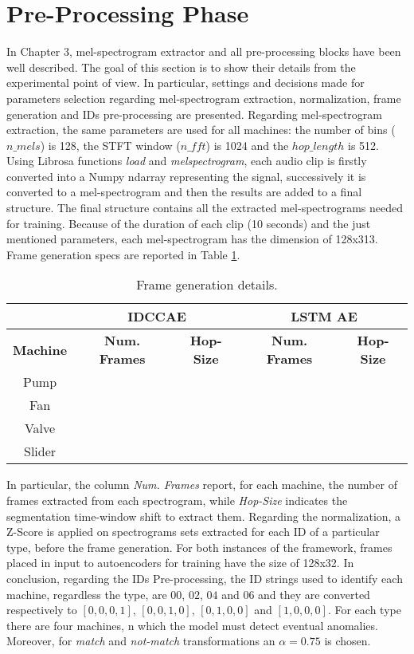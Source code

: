 \section{Pre-Processing Phase}
In Chapter 3, mel-spectrogram extractor and all pre-processing blocks have been well described. The goal of this section is to show their details from the experimental point of view. In particular, settings and decisions made for parameters selection regarding mel-spectrogram extraction, normalization, frame generation and IDs pre-processing are presented. Regarding mel-spectrogram extraction, the same parameters are used for all machines: the number of bins ($n\_mels$) is 128, the STFT window ($n\_fft$) is 1024 and the $hop\_length$ is 512. Using Librosa functions \textit{load} and \textit{melspectrogram}, each audio clip is firstly converted into a Numpy ndarray representing the signal, successively it is converted to a mel-spectrogram and then the results are added to a final structure. The final structure contains all the extracted mel-spectrograms needed for training. Because of the duration of each clip (10 seconds) and the just mentioned parameters, each mel-spectrogram has the dimension of 128x313. Frame generation specs are reported in Table \ref{frame-generation}.\\
\begin{table}[ht]
\centering
\begin{tabular}{|c|c|c|c|c|} 
\cline{2-5}
\multicolumn{1}{c|}{} & \multicolumn{2}{c|}{\textbf{IDCCAE}} & \multicolumn{2}{c|}{\textbf{LSTM AE}} \\ 
\hline
\textbf{Machine} & \textbf{Num. Frames} & \textbf{Hop-Size} & \textbf{Num. Frames} & \textbf{Hop-Size} \\ 
\hline
Pump &  &  &  &  \\ 
\hline
Fan &  &  &  &  \\ 
\hline
Valve &  &  &  &  \\ 
\hline
Slider &  &  &  &  \\
\hline
\end{tabular}
\caption{Frame generation details.}
\label{frame-generation}
\end{table}
In particular, the column \textit{Num. Frames} report, for each machine, the number of frames extracted from each spectrogram, while \textit{Hop-Size} indicates the segmentation time-window shift to extract them. Regarding the normalization, a Z-Score is applied on spectrograms sets extracted for each ID of a particular type, before the frame generation. For both instances of the framework, frames placed in input to autoencoders for training have the size of 128x32. In conclusion, regarding the IDs Pre-processing, the ID strings used to identify each machine, regardless the type, are $00$, $02$, $04$ and $06$ and they are converted respectively to $[0,0,0,1]$, $[0,0,1,0]$, $[0,1,0,0]$ and $[1,0,0,0]$. For each type there are four machines, n which the model must detect eventual anomalies. Moreover, for \textit{match} and \textit{not-match} transformations an $\alpha=0.75$ is chosen.

